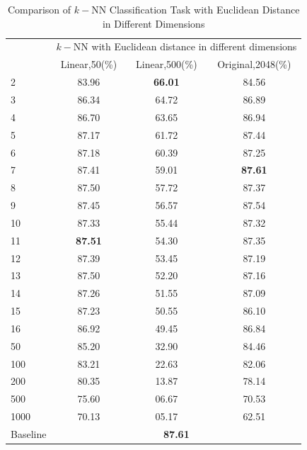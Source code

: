 \documentclass[conference]{IEEEtran}
\begin{document}
\begin{table}[htbp]
	\centering
 	\newcommand{\tabincell}[2]{\begin{tabular}{@{}#1@{}}#2\end{tabular}}
 	\renewcommand\arraystretch{1.0}
 	\caption{Comparison of $k-$NN Classification Task with Euclidean Distance in Different Dimensions}
 	\label{base1_2}%
 		\begin{tabular}{@{}p{1cm}<{\centering}|c|c|c}
 		\hline
 		\multirow{2}{*}{\diagbox[height=2\line,width=1.42cm,font=\tiny]{$k$}{Acc.}{$\mathit{M}$}} &
 		\multicolumn{3}{c}{$k-$NN with Euclidean distance in different dimensions}\\
 		\cline{2-4}
			& Linear,50(\%) & Linear,500(\%) & Original,2048(\%)\\
 		\hline
 		2   & 83.96 & \textbf{66.01} & 84.56 \\
 		3   & 86.34 & 64.72 & 86.89 \\
 		4   & 86.70 & 63.65 & 86.94 \\
 		5   & 87.17 & 61.72 & 87.44 \\
 		6   & 87.18 & 60.39 & 87.25 \\
 		7   & 87.41 & 59.01 & \textbf{87.61} \\
 		8   & 87.50 & 57.72 & 87.37 \\ 
 		9   & 87.45 & 56.57 & 87.54 \\
 		10   & 87.33 & 55.44 & 87.32 \\
 		11   & \textbf{87.51} & 54.30 & 87.35 \\
 		12   & 87.39 & 53.45 & 87.19 \\
 		13   & 87.50 & 52.20 & 87.16 \\
 		14   & 87.26 & 51.55 & 87.09 \\
 		15   & 87.23 & 50.55 & 86.10 \\
		16   & 86.92 & 49.45 & 86.84 \\
		50   & 85.20 & 32.90 & 84.46 \\
		100   & 83.21 & 22.63 & 82.06 \\
		200   & 80.35 & 13.87 & 78.14 \\
		500   & 75.60 & 06.67 & 70.53 \\
		1000   & 70.13 & 05.17 & 62.51 \\
		\hline
 		Baseline & \multicolumn{3}{c}{\textbf{87.61}} \\
		\hline
		\end{tabular}
\end{table}
\end{document}

